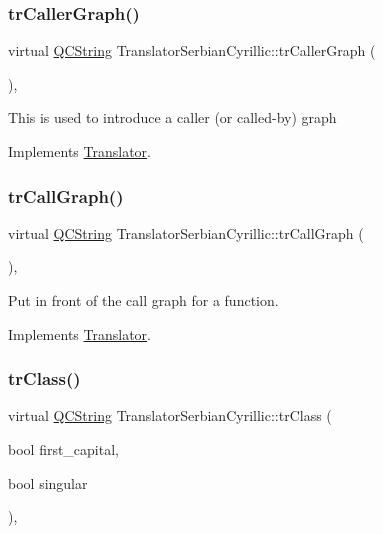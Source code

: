 \subsubsection{\texorpdfstring{trCallerGraph()}{trCallerGraph()}}
{\footnotesize\ttfamily virtual \mbox{\hyperlink{class_q_c_string}{Q\+C\+String}} Translator\+Serbian\+Cyrillic\+::tr\+Caller\+Graph (\begin{DoxyParamCaption}{ }\end{DoxyParamCaption})\hspace{0.3cm}{\ttfamily [inline]}, {\ttfamily [virtual]}}

This is used to introduce a caller (or called-\/by) graph 

Implements \mbox{\hyperlink{class_translator}{Translator}}.

\mbox{\label{class_translator_serbian_cyrillic_ad0b36f6a9593830503690e1575114db9}} 
\subsubsection{\texorpdfstring{trCallGraph()}{trCallGraph()}}
{\footnotesize\ttfamily virtual \mbox{\hyperlink{class_q_c_string}{Q\+C\+String}} Translator\+Serbian\+Cyrillic\+::tr\+Call\+Graph (\begin{DoxyParamCaption}{ }\end{DoxyParamCaption})\hspace{0.3cm}{\ttfamily [inline]}, {\ttfamily [virtual]}}

Put in front of the call graph for a function. 

Implements \mbox{\hyperlink{class_translator}{Translator}}.

\mbox{\label{class_translator_serbian_cyrillic_a1cfa424ca3399d82bd2b0edd54970a1a}} 
\subsubsection{\texorpdfstring{trClass()}{trClass()}}
{\footnotesize\ttfamily virtual \mbox{\hyperlink{class_q_c_string}{Q\+C\+String}} Translator\+Serbian\+Cyrillic\+::tr\+Class (\begin{DoxyParamCaption}\item[{bool}]{first\+\_\+capital,  }\item[{bool}]{singular }\end{DoxyParamCaption})\hspace{0.3cm}{\ttfamily [inline]}, {\ttfamily [virtual]}}

